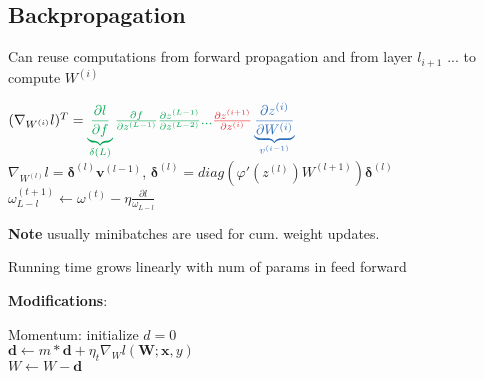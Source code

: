 \subsection{Backpropagation}

Can reuse computations from \color{NavyBlue} forward propagation \color{black} and from \color{Green} layer $l_{i+1}$ ... \color{black} to \color{Red} compute \color{black} $W^{(i)}$ 

\begin{center}
    $(\nabla_{W^{(i)}}l)^T  = \color{Green}\underbrace{\frac{\partial l}{\partial f}}_{\delta{(L)}}\frac{\partial f}{\partial z^{(L-1)}}\frac{\partial z^{(L-1)}}{\partial z^{(L-2)}}...\color{Red} \frac{\partial z^{(i+1)}}{\partial z^{(i)}}\color{NavyBlue}\underbrace{\frac{\partial z^{(i)}}{\partial W^{(i)}}}_{v^{(i-1)}}$\\
    $\nabla_{W^{(l)}}l = \boldsymbol{\delta}^{(l)}\boldsymbol{v}^{(l-1)}$, $\boldsymbol{\delta}^{(l)} = diag(\varphi'(z^{(l)})W^{(l+1)})\boldsymbol{\delta}^{(l)}$\\
    $\omega^{(t+1)}_{L-l} \leftarrow \omega^{(t)} - \eta \frac{\partial l}{\omega_{L-l}}$
\end{center}
\textbf{Note} usually minibatches are used for cum. weight updates.

Running time grows linearly with num of params in feed forward

\textbf{Modifications}:
\begin{center}
    Momentum: initialize $d = 0$\\
    $\boldsymbol{d} \leftarrow m*\boldsymbol{d} + \eta_t\nabla_Wl(\boldsymbol{W};\boldsymbol{x},y)$\\
    $W \leftarrow W - \boldsymbol{d}$
\end{center}

